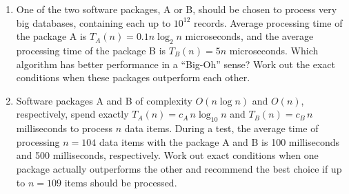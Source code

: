 \documentclass[11 pt]{article}
\begin{document}
\begin{enumerate}
    \item One of the two software packages, A or B, should be chosen to process very big databases, containing each up to $10^{12}$ records. Average processing time of the package A is $T_{A}(n) = 0.1 n \log_{2} n$ microseconds, and the average processing time of the package B is $T_{B}(n) = 5 n$ microseconds. Which algorithm has better performance in a ``Big-Oh'' sense? Work out the exact conditions when these packages outperform each other.
    
    \item Software packages A and B of complexity $O(n \log n)$ and $O(n)$, respectively, spend exactly $T_{A}(n) = c_{A}\,n \log_{10} n$ and $T_{B}(n) = c_{B}\,n$ milliseconds to process $n$ data items. During a test, the average time of processing $n = 104$ data items with the package A and B is 100 milliseconds and 500 milliseconds, respectively. Work out exact conditions when one package actually outperforms the other and recommend the best choice if up to $n = 109$ items should be processed.
    
\end{enumerate}
\end{document}
